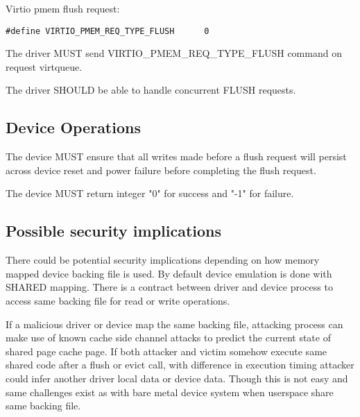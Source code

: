 Virtio pmem flush request:
\begin{lstlisting}
#define VIRTIO_PMEM_REQ_TYPE_FLUSH      0
\end{lstlisting}

The driver MUST send VIRTIO_PMEM_REQ_TYPE_FLUSH command on request virtqueue.

The driver SHOULD be able to handle concurrent FLUSH requests.

\subsection{Device Operations}\label{sec:Device Types / PMEM Driver / Device Operation}

The device MUST ensure that all writes made before a flush request will persist across device reset and power failure before completing the flush request.


The device MUST return integer "0" for success and "-1" for failure.

\subsection{Possible security implications}\label{sec:Device Types / PMEM Device / Possible Security Implications}

There could be potential security implications depending on how
memory mapped device backing file is used. By default device emulation
is done with SHARED mapping. There is a contract between driver and device
process to access same backing file for read or write operations.

If a malicious driver or device map the same backing file, attacking
process can make use of known cache side channel attacks to predict
the current state of shared page cache page. If both attacker and 
victim somehow execute same shared code after a flush or evict call, 
with difference in execution timing attacker could infer another driver
local data or device data. Though this is not easy and same challenges
exist as with bare metal device system when userspace share same backing file.


